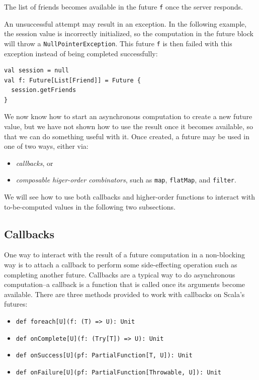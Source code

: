 The list of friends becomes available in the future \verb|f| once the server
responds.

An unsuccessful attempt may result in an exception. In the following example,
the session value is incorrectly initialized, so the computation in the future
block will throw a \verb|NullPointerException|. This future \verb|f| is then
failed with this exception instead of being completed successfully:

\begin{verbatim}
val session = null
val f: Future[List[Friend]] = Future {
  session.getFriends
}
\end{verbatim}

We now know how to start an asynchronous computation to create a new future
value, but we have not shown how to use the result once it becomes available, so
that we can do something useful with it. Once created, a future may be used in
one of two ways, either via:

\begin{itemize}
  \itemsep0em
  \item {\em callbacks}, or
  \item {\em composable higer-order combinators}, such as \verb|map|, \verb|flatMap|, and \verb|filter|.
\end{itemize}

We will see how to use both callbacks and higher-order functions to interact
with to-be-computed values in the following two subsections.

\subsection{Callbacks}

One way to interact with the result of a future computation in a non-blocking
way is to attach a callback to perform some side-effecting operation such as
completing another future. Callbacks are a typical way to do asynchronous
computation--a callback is a function that is called once its arguments become
available. There are three methods provided to work with callbacks on Scala's
futures:

\begin{itemize}
  \itemsep0em
  \item \verb|def foreach[U](f: (T) => U): Unit|
  \item \verb|def onComplete[U](f: (Try[T]) => U): Unit|
  \item \verb|def onSuccess[U](pf: PartialFunction[T, U]): Unit|
  \item \verb|def onFailure[U](pf: PartialFunction[Throwable, U]): Unit|
\end{itemize}

